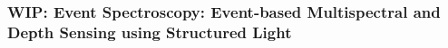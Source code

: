 \subsubsection{WIP: Event Spectroscopy: Event-based Multispectral and Depth Sensing using Structured Light}


